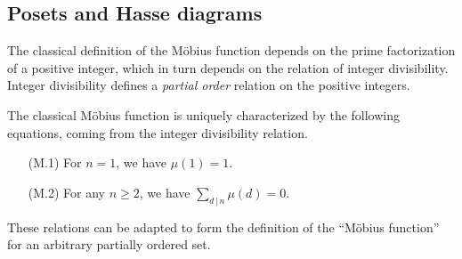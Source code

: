 \documentclass{amsart}
\newtheorem{prop}[thm]{Proposition}
\theoremstyle{definition}
\newtheorem{dfn}[thm]{Definition}
\newcommand{\RR}{\mathbb{R}}
\newcommand{\NN}{\mathbb{N}}
\newcommand{\ZZ}{\mathbb{Z}}
\newcommand{\Mobius}{M\"obius}
\begin{document}
\subsection{Posets and Hasse diagrams}
\label{sec:partial-order}

The classical definition of the \Mobius{} function depends on the prime factorization of a positive integer, which in turn depends on the relation of integer divisibility.
Integer divisibility defines a {\em partial order} relation on the positive integers.

The classical \Mobius{} function is uniquely characterized by the following equations, coming from the integer divisibility relation.

\begin{enumerate}[(i)]
    \item[(M.1)] For $n = 1$, we have $\mu(1) = 1$.
    
    \item[(M.2)] For any $n \geq 2$, we have $\sum_{d \,|\, n} \mu(d) = 0$.
\end{enumerate}
These relations can be adapted to form the definition of the ``\Mobius{} function'' for an arbitrary partially ordered set.





\end{document}
